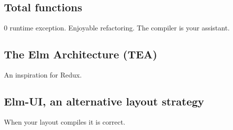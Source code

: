 \subsection{Total functions}%
\label{sub:total_functions}

0 runtime exception.
Enjoyable refactoring.
The compiler is your assistant.

\subsection{The Elm Architecture (TEA)}%
\label{sub:the_elm_architecture_tea_}

An inspiration for Redux.

\subsection{Elm-UI, an alternative layout strategy}%
\label{sub:elm_ui_an_alternative_layout_strategy}

When your layout compiles it is correct.
